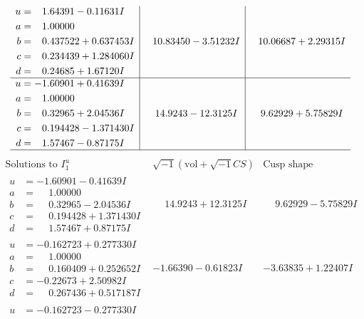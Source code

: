\documentclass[1p]{elsarticle_modified}
\theoremstyle{definition}
\newcommand{\I}{\sqrt{-1}}
\begin{document}
$$\begin{array}{c|c|c}
\begin{aligned}
u &= \phantom{-}1.64391 - 0.11631 I \\
a &= \phantom{-}1.00000\phantom{ +0.000000I} \\
b &= \phantom{-}0.437522 + 0.637453 I \\
c &= \phantom{-}0.234439 + 1.284060 I \\
d &= \phantom{-}0.24685 + 1.67120 I\end{aligned}
 & \phantom{-}10.83450 - 3.51232 I & \phantom{-}10.06687 + 2.29315 I \\ \hline\begin{aligned}
u &= -1.60901 + 0.41639 I \\
a &= \phantom{-}1.00000\phantom{ +0.000000I} \\
b &= \phantom{-}0.32965 + 2.04536 I \\
c &= \phantom{-}0.194428 - 1.371430 I \\
d &= \phantom{-}1.57467 - 0.87175 I\end{aligned}
 & \phantom{-}14.9243 - 12.3125 I & \phantom{-}9.62929 + 5.75829 I\\
 \hline 
 \end{array}$$\newpage$$\begin{array}{c|c|c}  
\text{Solutions to }I^u_{1}& \I (\text{vol} + \sqrt{-1}CS) & \text{Cusp shape}\\
 \hline 
\begin{aligned}
u &= -1.60901 - 0.41639 I \\
a &= \phantom{-}1.00000\phantom{ +0.000000I} \\
b &= \phantom{-}0.32965 - 2.04536 I \\
c &= \phantom{-}0.194428 + 1.371430 I \\
d &= \phantom{-}1.57467 + 0.87175 I\end{aligned}
 & \phantom{-}14.9243 + 12.3125 I & \phantom{-}9.62929 - 5.75829 I \\ \hline\begin{aligned}
u &= -0.162723 + 0.277330 I \\
a &= \phantom{-}1.00000\phantom{ +0.000000I} \\
b &= \phantom{-}0.160409 + 0.252652 I \\
c &= -0.22673 + 2.50982 I \\
d &= \phantom{-}0.267436 + 0.517187 I\end{aligned}
 & -1.66390 - 0.61823 I & -3.63835 + 1.22407 I \\ \hline\begin{aligned}
u &= -0.162723 - 0.277330 I \\

\end{aligned}
\end{array}$$
\end{document}
